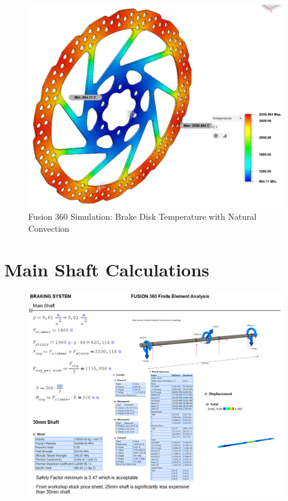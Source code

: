 \begin{figure}[H]
    \centering
    \includegraphics[width=0.8\linewidth]{chaps-append/calcs/disk_brake_heat_simulation.png}
    \caption{Fusion 360 Simulation: Brake Disk Temperature with Natural Convection}
    \label{fig:brake-fusion-simulation}
\end{figure}


\section{Main Shaft Calculations}
\label{calcs:main_braking_shaft}

\begin{figure}[H]
    \centering
    \includegraphics[width=0.9\linewidth]{chaps-append/calcs/main_shaft_calcs1.png}
\end{figure}

